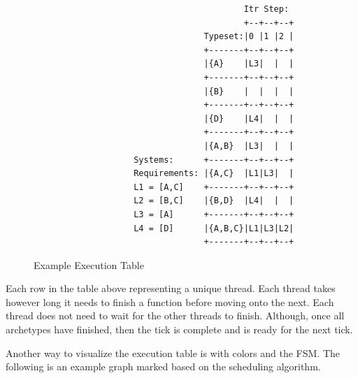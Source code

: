 \begin{figure}[H]
    \centering
    \begin{verbatim}
                                          Itr Step:                                          
                                          +--+--+--+                                         
                                  Typeset:|0 |1 |2 |                                         
                                  +-------+--+--+--+                                         
                                  |{A}    |L3|  |  |                                         
                                  +-------+--+--+--+                                         
                                  |{B}    |  |  |  |                                         
                                  +-------+--+--+--+                                         
                                  |{D}    |L4|  |  |                                         
                                  +-------+--+--+--+                                         
                                  |{A,B}  |L3|  |  |                                         
                    Systems:      +-------+--+--+--+                                         
                    Requirements: |{A,C}  |L1|L3|  |                                         
                    L1 = [A,C]    +-------+--+--+--+                                         
                    L2 = [B,C]    |{B,D}  |L4|  |  |                                         
                    L3 = [A]      +-------+--+--+--+                                         
                    L4 = [D]      |{A,B,C}|L1|L3|L2|                                         
                                  +-------+--+--+--+                                                                               
    \end{verbatim}
    \caption{Example Execution Table}
    \label{fig:graph1}
\end{figure}

Each row in the table above representing a unique thread. Each thread takes however long it needs to finish a function before moving onto the next. Each thread does not need to wait for the other threads to finish. Although, once all archetypes have finished, then the tick is complete and is ready for the next tick. 

Another way to visualize the execution table is with colors and the FSM. The following is an example graph marked based on the scheduling algorithm.

